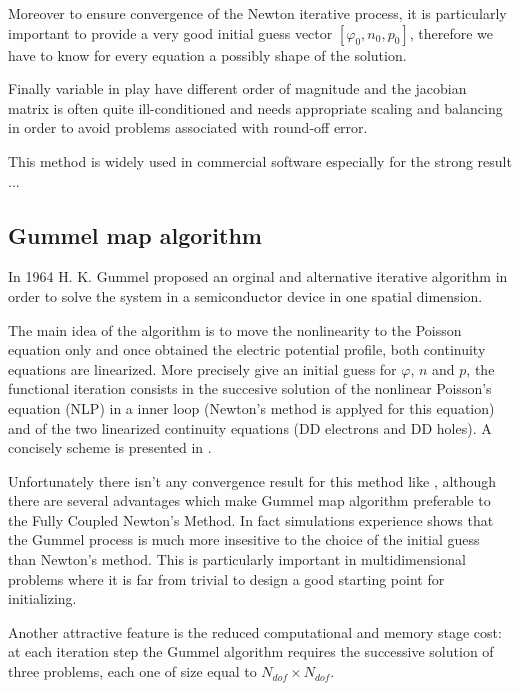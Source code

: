 Moreover to ensure convergence of the Newton iterative process, it is particularly important to provide a very good initial guess vector $[\varphi_0,n_0,p_0]$, therefore we have to know for every equation a possibly shape of the solution.

Finally variable in play have different order of magnitude and the jacobian matrix is often quite ill-conditioned and needs appropriate scaling and balancing in order to avoid problems associated with round-off error. 

This method is widely used in commercial software especially for the strong result ...


\subsection{Gummel map algorithm}

In 1964 H. K. Gummel proposed an orginal and alternative iterative algorithm in order to solve the system  in a semiconductor device in one spatial dimension.

The main idea of the algorithm is to move the nonlinearity to the Poisson equation only and once obtained the electric potential profile, both continuity equations are linearized.  More precisely give an initial guess for $\varphi$, $n$ and $p$, the functional iteration consists in the succesive solution of the nonlinear Poisson's equation (NLP) in a inner loop (Newton's method is applyed for this equation) and of the two linearized continuity equations (DD electrons and DD holes). 
A concisely scheme is presented in .

Unfortunately there isn't any convergence result for this method like , although there are several advantages which make Gummel map algorithm preferable to the Fully Coupled Newton's Method.
In fact simulations experience shows that the Gummel process is much more insesitive to the choice of the initial guess than Newton's method. This is particularly important in multidimensional problems where it is far from trivial to design a good starting point for initializing.

Another attractive feature is the reduced computational and memory stage cost: at each iteration step the Gummel algorithm requires the successive solution of three problems, each one of size equal to $N_{dof}\times N_{dof}$.






